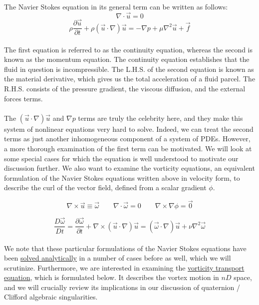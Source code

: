 \documentclass[12pt]{article}
\begin{document}
The Navier Stokes equation in its general term can be written as follows: 
\[\nabla\cdot\vec{u} = 0\]
\[\rho \frac{\partial\vec{u}}{\partial t} + \rho (\vec{u}\cdot\nabla)\vec{u} = -\nabla p + \mu \nabla^{2} \vec{u} + \vec{f}\]\\
The first equation is referred to as the continuity equation, whereas the second is known as the momentum equation. The continuity equation establishes that the fluid in question is incompressible. The L.H.S. of the second equation is known as the material derivative, which gives us the total acceleration of a fluid parcel. The R.H.S. consists of the pressure gradient, the viscous diffusion, and the external forces terms. \\ \\
The $(\vec u \cdot \nabla ) \vec u$ and $\nabla p$ terms are truly the celebrity here, and they make this system of nonlinear equations very hard to solve. Indeed, we can treat the second terms as just another inhomogeneous component of a system of PDEs. However, a more thorough examination of the first term can be motivated. We will look at some special cases for which the equation is well understood to motivate our discussion further. We also want to examine the vorticity equations, an equivalent formulation of the Navier Stokes equations written above in velocity form, to describe the curl of the vector field, defined from a scalar gradient $\phi$. 

\[\nabla \times \vec u \equiv \vec \omega \qquad \nabla \cdot \vec \omega = 0 \qquad \nabla \times \nabla \phi = \vec 0 \]

\[\frac{D \vec \omega}{Dt} = \frac{\partial \vec \omega}{\partial t} + \nabla \times (\vec u \cdot \nabla) \vec u = (\vec \omega \cdot \nabla) \vec u + \nu \nabla^{2} \vec \omega\] \\ 
We note that these particular formulations of the Navier Stokes equations have been \href{https://www.diva-portal.org/smash/get/diva2:205082/fulltext01.pdf}{solved analytically} in a number of cases before as well, which we will scrutinize. Furthermore, we are interested in examining the \href{http://brennen.caltech.edu/fluidbook/basicfluiddynamics/equationsofmotion/vorticitytransport.pdf}{vorticity transport equation}, which is formulated below. It describes the vortex motion in $nD$ space, and we will crucially review its implications in our discussion of quaternion / Clifford algebraic singularities. 
\end{document}
